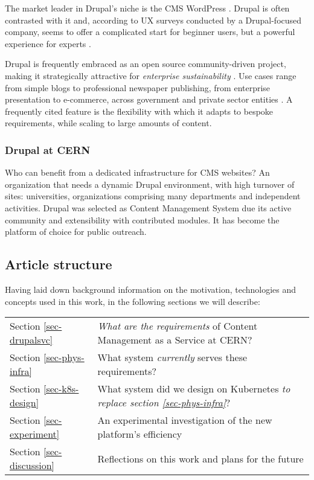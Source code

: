 The market leader in Drupal's niche is the CMS WordPress \cite{builtwithptyltdOpenSourceUsage}.
Drupal is often contrasted with it and, according to UX surveys conducted by a Drupal-focused company, seems to offer a complicated start for beginner users,
but a powerful experience for experts \cite{buytaertStateDrupalPresentation}.

Drupal is frequently embraced as an open source community-driven project, making it strategically attractive for \emph{enterprise sustainability} \cite{cern.genevaRealCostsOpen2019}.
Use cases range from simple blogs to professional newspaper publishing, from enterprise presentation to e-commerce, across government and private sector entities \cite{drupalcommunityExploreFeaturedCase}.
A frequently cited feature is the flexibility with which it adapts to bespoke requirements, while scaling to large amounts of content.

\subsubsection*{Drupal at CERN}
\label{drupal-at-cern}

Who can benefit from a dedicated infrastructure for CMS websites?
An organization that needs a dynamic Drupal environment, with high turnover of sites: universities, organizations comprising many departments and independent activities.
Drupal was selected as Content Management System due its active community and extensibility with contributed modules.
It has become the platform of choice for public outreach.

\subsection{Article structure}

Having laid down background information on the motivation, technologies and concepts used in this work, in the following sections we will describe:

\begin{tabular}{l|l}
    Section \ref{sec-drupalsvc} & \emph{What are the requirements} of Content Management as a Service at CERN?  \\
    Section \ref{sec-phys-infra} & What system \emph{currently} serves these requirements? \\
    Section \ref{sec-k8s-design} & What system did we design on Kubernetes \emph{to replace section \ref{sec-phys-infra}}? \\
    Section \ref{sec-experiment} & An experimental investigation of the new platform's efficiency \\
    Section \ref{sec-discussion} & Reflections on this work and plans for the future \\
\end{tabular}